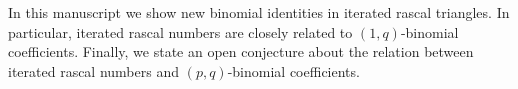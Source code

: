 In this manuscript we show new binomial identities in iterated rascal triangles.
In particular, iterated rascal numbers are closely related to $(1,q)$-binomial coefficients.
Finally, we state an open conjecture about the relation between iterated rascal numbers and
$(p,q)$-binomial coefficients.
